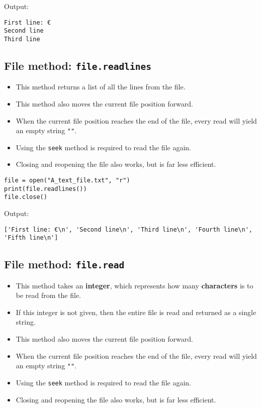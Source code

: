 \documentclass[11pt]{article}
\begin{document}
 \noindent Output:

\begin{verbatim}
First line: €
Second line
Third line
\end{verbatim}


 \newpage

\subsection{File method: \texttt{file.readlines}}
\label{sec:orge2dd690}
\begin{itemize}
\item This method returns a list of all the lines from the file.
\item This method also moves the current file position forward.
\item When the current file position reaches the end of the file, every read will yield an empty string \texttt{""}.
\item Using the \texttt{seek} method is required to read the file again.
\item Closing and reopening the file also works, but is far less efficient.
\end{itemize}

\begin{verbatim}
file = open("A_text_file.txt", "r")
print(file.readlines())
file.close()
\end{verbatim}

 \noindent Output:

\begin{verbatim}
['First line: €\n', 'Second line\n', 'Third line\n', 'Fourth line\n', 'Fifth line\n']
\end{verbatim}


 \newpage

\subsection{File method: \texttt{file.read}}
\label{sec:org34d1915}
\begin{itemize}
\item This method takes an \textbf{integer}, which represents how many \textbf{characters} is to be read from the file.
\item If this integer is not given, then the entire file is read and returned as a single string.
\item This method also moves the current file position forward.
\item When the current file position reaches the end of the file, every read will yield an empty string \texttt{""}.
\item Using the \texttt{seek} method is required to read the file again.
\item Closing and reopening the file also works, but is far less efficient.
\end{itemize}
\end{document}

